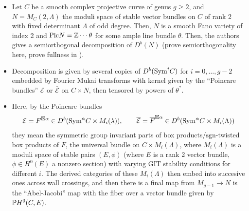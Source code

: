 \documentclass[12pt]{article}
\begin{document}
\cite{Tevelev_Torres_2023} 
\begin{itemize}
    \item Let $C$ be a smooth complex projective curve of genus $g\geq 2$, and $N=M_C(2,\Lambda)$ the moduli space of stable vector bundles on $C$ of rank 2 with fixed determinant $\Lambda$ of odd degree. Then, $N$ is a smooth Fano variety of index 2 and $\Pic N = \Z\cdots \theta$ for some ample line bundle $\theta$. Then, the authors gives a semiorthogonal decomposition of $D^b(N)$ (prove semiorthogonality here, prove fullness in \cite{Tevelev_2023}).
    \item Decomposition is given by several copies of $D^b(\Sym^i C)$ for $i=0,\dots,g-2$ embedded by Fourier Mukai transforms with kernel given by the ``Poincare bundles'' $\mathcal{E}$ or $\overline{\mathcal{E}}$ on $C\times N$, then tensored by powers of $\theta^*$.
    \item Here, by the Poincare bundles
    \[\mathcal{E} = F^{\boxtimes \alpha} \in D^b(\Sym^\alpha C \times M_i(\lambda)), \qquad \overline{\mathcal{E}} = \overline{F}^{\boxtimes \alpha} \in D^b(\Sym^\alpha C \times M_i(\Lambda))\]
    they mean the symmetric group invariant parts of box products/$\mathrm{sgn}$-twisted box products of $F$, the universal bundle on $C\times M_i(\Lambda)$, where $M_i(\Lambda)$ is a moduli space of stable pairs $(E,\phi)$ (where $E$ is a rank 2 vector bundle, $\phi\in H^0(E)$ a nonzero section) with varying GIT stability conditions for different $i$. The derived categories of these $M_i(\Lambda)$ then embed into succesive ones across wall crossings, and then there is a final map from $M_{g-1}\to N$ is the ``Abel-Jacobi'' map with the fiber over a vector bundle given by $\P H^0(C,E)$.
\end{itemize}



\end{document}
